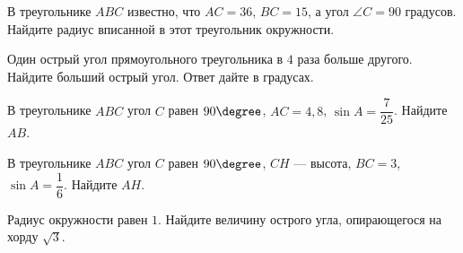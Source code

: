 \begin{homework}[number=4]
\begin{listofex}
		\item В треугольнике \(ABC\) известно, что \(AC = 36\), \(BC = 15\), а угол \(\angle C=90\) градусов. Найдите радиус вписанной в этот треугольник окружности.
		\item Один острый угол прямоугольного треугольника в \( 4 \) раза больше другого. Найдите больший острый угол. Ответ дайте в градусах.
		\item В треугольнике \(ABC\) угол \(C\) равен \(90 \degree \), \(AC=4,8\), \(\sin{A} = \dfrac{7}{25}\). Найдите \(AB\).
		\item В треугольнике \(ABC\) угол \(C\) равен \(90 \degree \), \(CH\) --- высота, \(BC=3\), \(\sin{A} = \dfrac{1}{6}\). Найдите \(AH\).
		\item Радиус окружности равен \(1\). Найдите величину острого угла, опирающегося на хорду \(\sqrt{3}\).
	\end{listofex}
\end{homework}

